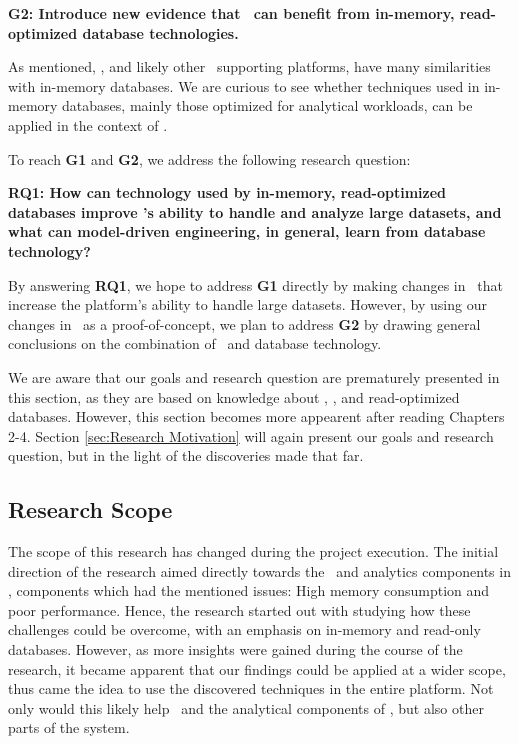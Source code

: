 \setlength{\leftskip}{1cm}

\textbf{G2: Introduce new evidence that \mde~can benefit from in-memory, read-optimized database technologies.}

\setlength{\leftskip}{0pt}

As mentioned, \gap, and likely other \mde~supporting platforms, have many similarities with in-memory databases. We are curious to see whether techniques used in in-memory databases, mainly those optimized for analytical workloads, can be applied in the context of \mde. 

To reach \textbf{G1} and \textbf{G2}, we address the following research question:

\setlength{\leftskip}{1cm}

\textbf{RQ1: How can technology used by in-memory, read-optimized databases improve \gap's ability to handle and analyze large datasets, and what can model-driven engineering, in general, learn from database technology?}

\setlength{\leftskip}{0pt}

By answering \textbf{RQ1}, we hope to address \textbf{G1} directly by making changes in \gap~that increase the platform's ability to handle large datasets. However, by using our changes in \gap~as a proof-of-concept, we plan to address \textbf{G2} by drawing general conclusions on the combination of \mde~and database technology.

We are aware that our goals and research question are prematurely presented in this section, as they are based on knowledge about \mde, \gap, and read-optimized databases. However, this section becomes more appearent after reading Chapters 2-4. Section \ref{sec:Research Motivation} will again present our goals and research question, but in the light of the discoveries made that far.

\subsection{Research Scope}
\label{sub:Research Scope}
The scope of this research has changed during the project execution. The initial direction of the research aimed directly towards the \bi~and analytics components in \gap, components which had the mentioned issues: High memory consumption and poor performance. Hence, the research started out with studying how these challenges could be overcome, with an emphasis on in-memory and read-only databases. However, as more insights were gained during the course of the research, it became apparent that our findings could be applied at a wider scope, thus came the idea to use the discovered techniques in the entire platform. Not only would this likely help \bi~and the analytical components of \gap, but also other parts of the system.

